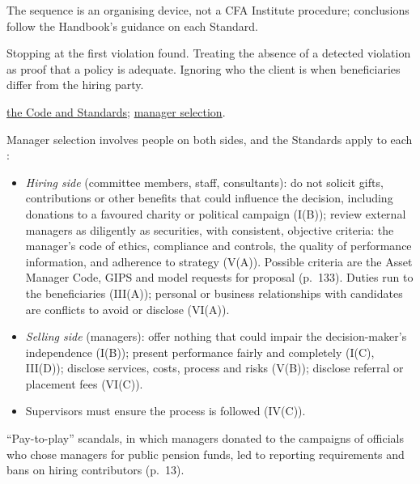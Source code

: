 \begin{qfmethod}
 The sequence is an organising device, not a CFA Institute procedure; conclusions follow the Handbook's guidance on each Standard.

 Stopping at the first violation found. Treating the absence of a detected violation as proof that a policy is adequate. Ignoring who the client is when beneficiaries differ from the hiring party.

 \hyperref[def:code-of-ethics-standards]{the Code and Standards}; \hyperref[meth:standards-in-manager-selection]{manager selection}.

\end{qfmethod}

\begin{qfmethod}\label{meth:standards-in-manager-selection}
 Manager selection involves people on both sides, and the Standards apply to each \citep[pp.~13, 132--133]{standards-practice-handbook-2024}:
\begin{itemize}
\item \emph{Hiring side} (committee members, staff, consultants): do not solicit gifts, contributions or other benefits that could influence the decision, including donations to a favoured charity or political campaign (I(B)); review external managers as diligently as securities, with consistent, objective criteria: the manager's code of ethics, compliance and controls, the quality of performance information, and adherence to strategy (V(A)). Possible criteria are the Asset Manager Code, GIPS and model requests for proposal (p.~133). Duties run to the beneficiaries (III(A)); personal or business relationships with candidates are conflicts to avoid or disclose (VI(A)).
\item \emph{Selling side} (managers): offer nothing that could impair the decision-maker's independence (I(B)); present performance fairly and completely (I(C), III(D)); disclose services, costs, process and risks (V(B)); disclose referral or placement fees (VI(C)).
\item Supervisors must ensure the process is followed (IV(C)).
\end{itemize}
``Pay-to-play'' scandals, in which managers donated to the campaigns of officials who chose managers for public pension funds, led to reporting requirements and bans on hiring contributors (p.~13).


\end{qfmethod}
